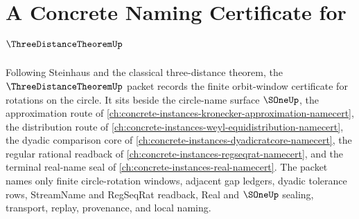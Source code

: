 \chapter{A Concrete Naming Certificate for $\ThreeDistanceTheoremUp$}
\label{ch:concrete-instances-three-distance-theorem-namecert}

Following Steinhaus and the classical three-distance theorem, the $\ThreeDistanceTheoremUp$ packet records the finite orbit-window certificate for rotations on the circle. It sits beside the circle-name surface $\SOneUp$, the approximation route of \autoref{ch:concrete-instances-kronecker-approximation-namecert}, the distribution route of \autoref{ch:concrete-instances-weyl-equidistribution-namecert}, the dyadic comparison core of \autoref{ch:concrete-instances-dyadicratcore-namecert}, the regular rational readback of \autoref{ch:concrete-instances-regseqrat-namecert}, and the terminal real-name seal of \autoref{ch:concrete-instances-real-namecert}. The packet names only finite circle-rotation windows, adjacent gap ledgers, dyadic tolerance rows, StreamName and RegSeqRat readback, Real and $\SOneUp$ sealing, transport, replay, provenance, and local naming.

